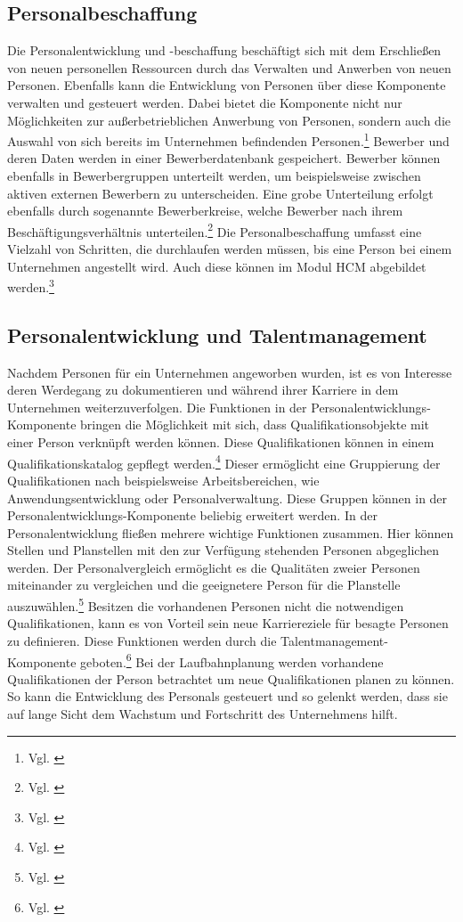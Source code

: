 \subsection{Personalbeschaffung}
Die Personalentwicklung und -beschaffung beschäftigt sich mit dem Erschließen von neuen personellen Ressourcen durch das Verwalten und Anwerben von neuen Personen.
Ebenfalls kann die Entwicklung von Personen über diese Komponente verwalten und gesteuert werden.
Dabei bietet die Komponente nicht nur Möglichkeiten zur außerbetrieblichen Anwerbung von Personen, sondern auch die Auswahl von sich bereits im Unternehmen befindenden Personen.\footnote{Vgl. \cite{SSSUM2019a}}
Bewerber und deren Daten werden in einer Bewerberdatenbank gespeichert. Bewerber können ebenfalls in Bewerbergruppen unterteilt werden, um beispielsweise zwischen aktiven externen Bewerbern zu unterscheiden. Eine grobe Unterteilung erfolgt ebenfalls durch sogenannte Bewerberkreise, welche Bewerber nach ihrem Beschäftigungsverhältnis unterteilen.\footnote{Vgl. \cite{SSSUM2019}}
Die Personalbeschaffung umfasst eine Vielzahl von Schritten, die durchlaufen werden müssen, bis eine Person bei einem Unternehmen angestellt wird. Auch diese können im Modul HCM abgebildet werden.\footnote{Vgl. \cite{SSSUM2019a}}

\subsection{Personalentwicklung und Talentmanagement}
Nachdem Personen für ein Unternehmen angeworben wurden, ist es von Interesse deren Werdegang zu dokumentieren und während ihrer Karriere in dem Unternehmen weiterzuverfolgen.
Die Funktionen in der Personalentwicklungs-Komponente bringen die Möglichkeit mit sich, dass Qualifikationsobjekte mit einer Person verknüpft werden können. Diese Qualifikationen können in einem Qualifikationskatalog gepflegt werden.\footnote{Vgl. \cite{SSSUM2019a}}
Dieser ermöglicht eine Gruppierung der Qualifikationen nach beispielsweise Arbeitsbereichen, wie Anwendungsentwicklung oder Personalverwaltung.
Diese Gruppen können in der Personalentwicklungs-Komponente beliebig erweitert werden.
In der Personalentwicklung fließen mehrere wichtige Funktionen zusammen.
Hier können Stellen und Planstellen mit den zur Verfügung stehenden Personen abgeglichen werden.
Der Personalvergleich ermöglicht es die Qualitäten zweier Personen miteinander zu vergleichen und die geeignetere Person für die Planstelle auszuwählen.\footnote{Vgl. \cite{SSSUM2019a}}
Besitzen die vorhandenen Personen nicht die notwendigen Qualifikationen, kann es von Vorteil sein neue Karriereziele für besagte Personen zu definieren.
Diese Funktionen werden durch die Talentmanagement-Komponente geboten.\footnote{Vgl. \cite{SSSUM2019}}
Bei der Laufbahnplanung werden vorhandene Qualifikationen der Person betrachtet um neue Qualifikationen planen zu können.
So kann die Entwicklung des Personals gesteuert und so gelenkt werden, dass sie auf lange Sicht dem Wachstum und Fortschritt des Unternehmens hilft.

